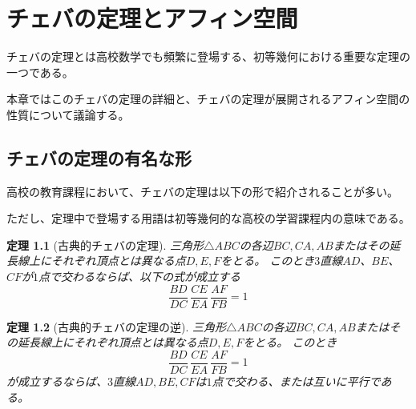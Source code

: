 \documentclass[a4paper,12pt]{bxjsbook}
\newlength{\customindent}
\newenvironment{body}{
  \par
  \begingroup
  \setlength{\leftskip}{\customindent}
  \setlength{\rightskip}{0pt}
  \setlength{\parindent}{1em}
  \setlength{\displayindent}{\customindent}
  \setlength{\displaywidth}{\dimexpr\linewidth-\customindent\relax}
}{
  \par
  \endgroup
}
\theoremstyle{theorem}
\newtheorem{theorem}{定理}[chapter]
\begin{document}
    \chapter{チェバの定理とアフィン空間}
    \begin{body}
        \indent チェバの定理とは高校数学でも頻繁に登場する、初等幾何における重要な定理の一つである。

        \indent 本章ではこのチェバの定理の詳細と、チェバの定理が展開されるアフィン空間の性質について議論する。

    \end{body}

    \section{チェバの定理の有名な形}

    \begin{body}
        \indent 高校の教育課程において、チェバの定理は以下の形で紹介されることが多い。

        \indent ただし、定理中で登場する用語は初等幾何的な高校の学習課程内の意味である。
    \end{body}

    \begin{theorem}[古典的チェバの定理]\label{thm:classical-ceva}
        三角形$\triangle ABC$の各辺$BC,CA,AB$またはその延長線上にそれぞれ頂点とは異なる点$D,E,F$をとる。
        このとき$3$直線$AD$、$BE$、$CF$が$1$点で交わるならば、以下の式が成立する
        \[
          \dfrac{BD}{DC}\,\dfrac{CE}{EA}\,\dfrac{AF}{FB} = 1
        \]
    \end{theorem}

    \begin{theorem}[古典的チェバの定理の逆]
        三角形$\triangle ABC$の各辺$BC,CA,AB$またはその延長線上にそれぞれ頂点とは異なる点$D,E,F$をとる。
        このとき
        \[
          \dfrac{BD}{DC}\,\dfrac{CE}{EA}\,\dfrac{AF}{FB} = 1
        \]
        が成立するならば、$3$直線$AD,BE,CF$は$1$点で交わる、または互いに平行である。
    \end{theorem}
\end{document}
